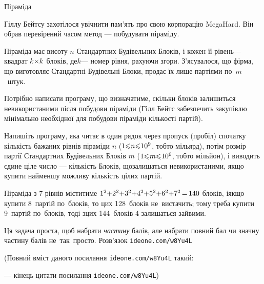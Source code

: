 \documentclass[14pt,a4paper]{extarticle}
\def\dib#1{\,#1\discretionary{}{\mbox{$#1$}}{}\,}
\renewcommand{\baselinestretch}{1.3125}
\begin{document}
\begin{problemAllDefault}{Піраміда}

Гіллу Бейтсу захотілося увічнити пам'ять про свою корпорацію MegaHard. Він обрав перевірений часом метод --- побудувати піраміду.

Піраміда має висоту $n$ Стандартних Будівельних Блоків, і кожен її рівень\nolinebreak[3] --- квадрат $k{\times}k$ блоків, де\nolinebreak[3] $k$\nolinebreak[3] --- номер рівня, рахуючи згори. З'ясувалося, що фірма, що виготовляє Стандартні Будівельні Блоки, продає їх лише партіями по~$m$~штук.

{

Потрібно написати програму, що визначатиме, скільки блоків залишиться не\nolinebreak[3] використаними після побудови піраміди (Гілл Бейтс забезпечить закупівлю мінімально необхідної для побудови піраміди кількості партій).

Напишіть програму, яка читає в один рядок через пропуск (пробіл) спочатку кількість бажаних рівнів піраміди $n$ ($1{\leqslant}n{\leqslant}10^9$, тобто мільярд), потім розмір партії Стандартних Будівельних Блоків $m$ ($1{\leqslant}m{\leqslant}10^6$, тобто мільйон), і виводить єдине ціле число --- кількість Блоків, що\nolinebreak[3] залишаться не\nolinebreak[3] використаними, якщо купити найменшу можливу кількість цілих партій.

}

\Example
\begin{exampleSimple}{4em}{4em}%
%
\end{exampleSimple}

\Note
Піраміда з 7 рівнів міститиме %
$1^2{+}2^2{+}3^2{+}4^2{+}5^2{+}6^2{+}7^2\dib{{=}}140$
блоків, і\nolinebreak[3] якщо купити 8~партій по~блоків, то цих 128~блоків не~вистачить; тому треба купити 9~партій по~блоків, тоді з\nolinebreak[3] цих 144~блоків 4 залишаться зайвими.


\end{problemAllDefault}
	

\Tutorial
Ця задача проста, щоб набрати \emph{частину} балів, але набрати повний бал чи значну частину балів не~так~просто. Розв'язок 
\verb"ideone.com/w8Yu4L"


{\color{green}\begin{small}

\renewcommand{\baselinestretch}{0.875}

(Повний вміст даного посилання \verb"ideone.com/w8Yu4L" такий:

--- кінець цитати посилання \verb"ideone.com/w8Yu4L")

\end{small}}
\end{document}
